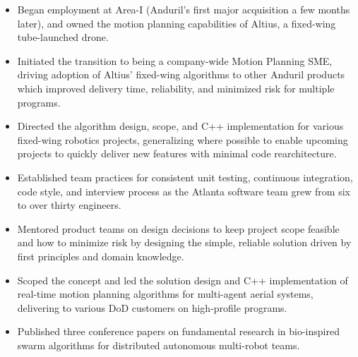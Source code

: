 \documentclass[10pt,a4paper,ragged2e,withhyper]{altacv}
\begin{document}
\begin{paracol}{2}

\begin{itemize}
\item Began employment at Area-I (Anduril's first major acquisition a few months later), and owned the motion planning capabilities of Altius, a fixed-wing tube-launched drone.
\item Initiated the transition to being a company-wide Motion Planning SME, driving adoption of Altius' fixed-wing algorithms to other Anduril products which improved delivery time, reliability, and minimized risk for multiple programs.
\item Directed the algorithm design, scope, and C++ implementation for various fixed-wing robotics projects, generalizing where possible to enable upcoming projects to quickly deliver new features with minimal code rearchitecture.
\item Established team practices for consistent unit testing, continuous integration, code style, and interview process as the Atlanta software team grew from six to over thirty engineers.
\item Mentored product teams on design decisions to keep project scope feasible and how to minimize risk by designing the simple, reliable solution driven by first principles and domain knowledge.
\end{itemize}

\divider

\begin{itemize}
\item Scoped the concept and led the solution design and C++ implementation of real-time motion planning algorithms for multi-agent aerial systems, delivering to various DoD customers on high-profile programs.
\item Published three conference papers on fundamental research in bio-inspired swarm algorithms for distributed autonomous multi-robot teams.
\end{itemize}

\divider


\end{paracol}
\end{document}
